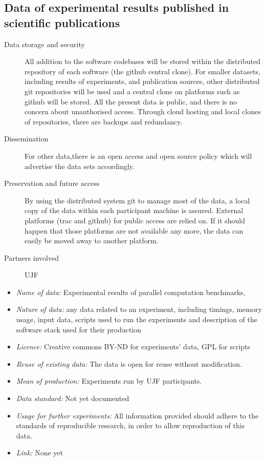 \documentclass{../../Proposal/LaTeX-proposal/deliverablereport}
\begin{document}
\begin{enumerate}
\subsection{Data of experimental results published in scientific publications}

\begin{description}
\item[Data storage and security] All addition to the software codebases will be stored within the distributed repository of each software (the github central clone). For smaller datasets, including results of experiments, and publication sources, other distributed git repositories will be used and a central clone on platforms such as github will be stored. All the present data is public, and there is no concern about unauthorised access. Through cloud hosting and local clones of repositories, there are backups and redundancy.
\item[Dissemination] For other data,there is an open access and open source policy which will advertise the data sets accordingly.
\item[Preservation and future access] By using the distributed system git to manage most of the data, a local copy of the data within each participant machine is assured. External platforms (trac and github) for public access are relied on. If it should happen that those platforms are not available any more, the data can easily be moved away to another platform.
\item[Partners involved] UJF
\end{description}

\begin{itemize}
\item\textit{Name of data:} Experimental results of parallel computation benchmarks,
\item\textit{Nature of data:} any data related to an experiment, including timings,
  memory usage, input data, scripts used to run the experiments and description
  of the software stack used for their production
\item\textit{Licence:} Creative commons BY-ND for experiments' data, GPL for scripts
\item\textit{Reuse of existing data:} The data is open for reuse without modification.
\item\textit{Mean of production:} Experiments run by UJF participants.
\item\textit{Data standard:} Not yet documented
\item\textit{Usage for further experiments:} All information provided should adhere to
  the standards of reproducible research, in order to allow reproduction of
  this data.
\item\textit{Link:} None yet
\end{itemize}




\end{enumerate}
\end{document}
